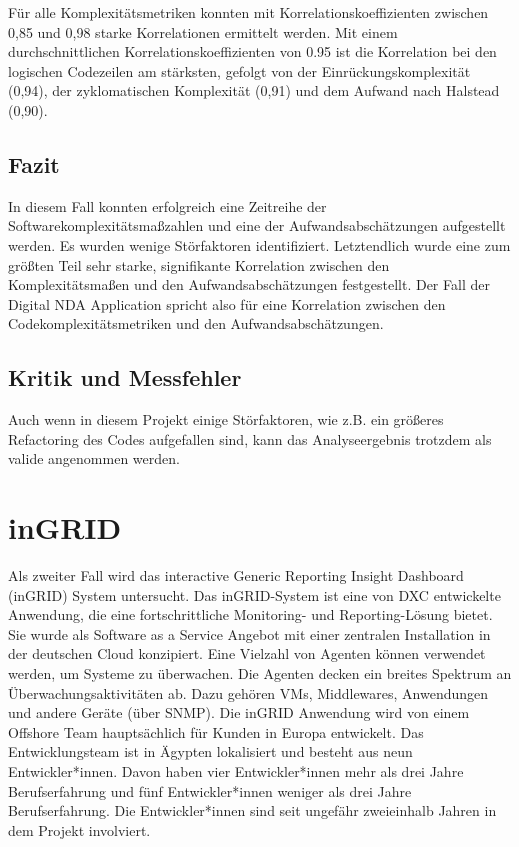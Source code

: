 Für alle Komplexitätsmetriken konnten mit Korrelationskoeffizienten
zwischen 0,85 und 0,98 starke Korrelationen ermittelt werden. Mit einem
durchschnittlichen Korrelationskoeffizienten von 0.95 ist die
Korrelation bei den logischen Codezeilen am stärksten, gefolgt von der
Einrückungskomplexität (0,94), der zyklomatischen Komplexität (0,91) und
dem Aufwand nach Halstead (0,90).

\subsection{Fazit}\label{Fazit}

In diesem Fall konnten erfolgreich eine Zeitreihe der
Softwarekomplexitätsmaßzahlen und eine der Aufwandsabschätzungen
aufgestellt werden. Es wurden wenige Störfaktoren identifiziert.
Letztendlich wurde eine zum größten Teil sehr starke, signifikante
Korrelation zwischen den Komplexitätsmaßen und den Aufwandsabschätzungen
festgestellt. Der Fall der Digital NDA Application spricht also für eine
Korrelation zwischen den Codekomplexitätsmetriken und den
Aufwandsabschätzungen.

\subsection{Kritik und Messfehler}\label{Kritik-und-Messfehler}

Auch wenn in diesem Projekt einige Störfaktoren, wie z.B. ein größeres
Refactoring des Codes aufgefallen sind, kann das Analyseergebnis
trotzdem als valide angenommen werden.

\section{inGRID}\label{ingrid}

Als zweiter Fall wird das interactive Generic Reporting Insight
Dashboard (inGRID) System untersucht. Das inGRID-System ist eine von DXC
entwickelte Anwendung, die eine fortschrittliche Monitoring- und
Reporting-Lösung bietet. Sie wurde als Software as a Service Angebot mit
einer zentralen Installation in der deutschen Cloud konzipiert. Eine
Vielzahl von Agenten können verwendet werden, um Systeme zu überwachen.
Die Agenten decken ein breites Spektrum an Überwachungsaktivitäten ab.
Dazu gehören VMs, Middlewares, Anwendungen und andere Geräte (über
SNMP). Die inGRID Anwendung wird von einem Offshore Team hauptsächlich
für Kunden in Europa entwickelt. Das Entwicklungsteam ist in Ägypten
lokalisiert und besteht aus neun Entwickler*innen. Davon haben vier
Entwickler*innen mehr als drei Jahre Berufserfahrung und fünf
Entwickler*innen weniger als drei Jahre Berufserfahrung. Die
Entwickler*innen sind seit ungefähr zweieinhalb Jahren in dem Projekt
involviert.

